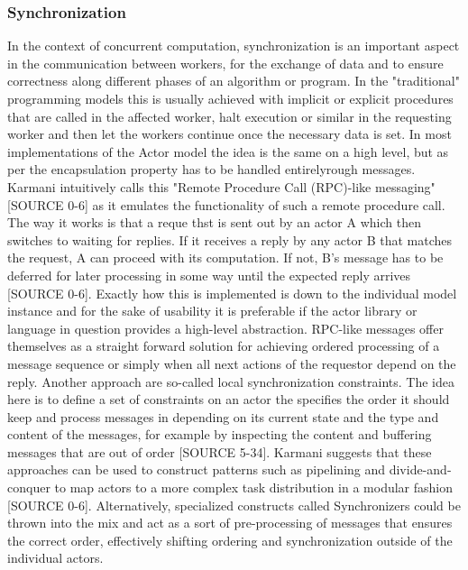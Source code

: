 \documentclass[A4]{article}
\begin{document}
\subsubsection{Synchronization}
In the context of concurrent computation, synchronization is an important aspect in the communication between workers, for the exchange of data and to ensure correctness along different phases of an algorithm or program. In the "traditional" programming models this is usually achieved with implicit or explicit procedures that are called in the affected worker, halt execution or similar in the requesting worker and then let the workers continue once the necessary data is set. 
In most implementations of the Actor model the idea is the same on a high level, but as per the encapsulation property has to be handled entirelyrough messages. Karmani intuitively calls this "Remote Procedure Call (RPC)-like messaging" [SOURCE 0-6] as it emulates the functionality of such a remote procedure call. The way it works is that a reque thst is sent out by an actor A which then switches to waiting for replies. If it receives a reply by any actor B that matches the request, A can proceed with its computation. If not, B's message has to be deferred for later processing in some way until the expected reply arrives [SOURCE 0-6]. Exactly how this is implemented is down to the individual model instance and for the sake of usability it is preferable if the actor library or language in question provides a high-level abstraction. 
RPC-like messages offer themselves as a straight forward solution for achieving ordered processing of a message sequence or simply when all next actions of the requestor depend on the reply. 
Another approach are so-called local synchronization constraints. The idea here is to define a set of constraints on an actor the specifies the order it should keep and process messages in depending on its current state and the type and content of the messages, for example by inspecting the content and buffering messages that are out of order [SOURCE 5-34]. 
Karmani suggests that these approaches can be used to construct patterns such as pipelining and divide-and-conquer to map actors to a more complex task distribution in a modular fashion [SOURCE 0-6].
Alternatively, specialized constructs called Synchronizers could be thrown into the mix and act as a sort of pre-processing of messages that ensures the correct order, effectively shifting ordering and synchronization outside of the individual actors. 
\end{document}
